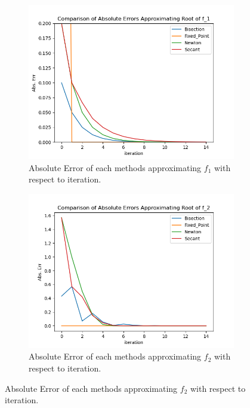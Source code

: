 \documentclass[a4paper,12pt]{article}
\begin{document}
\begin{figure}[H]
	\begin{subfigure}[b]{0.49\textwidth}
	    \centering
	     \includegraphics[width=\textwidth]{img/report1/f1_err.png}
	     \caption{Absolute Error of each methods approximating $f_1$ with respect to iteration.}
	     \label{fig:2}   
	\end{subfigure}
	\hfill	
	\begin{subfigure}[b]{0.49\textwidth}
	    \centering
	     \includegraphics[width=\textwidth]{img/report1/f2_err.png}
	     \caption{Absolute Error of each methods approximating $f_2$ with respect to iteration.}
	     \label{fig:3}   
	\end{subfigure}
\end{figure}
\end{document}
